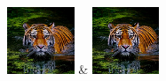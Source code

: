 \begin{table}[h!]
\begin{tabular}
        \includegraphics[width=2cm]{images/processed/tiger/gaussian_5x5_sigma1.0/unblurred_10-iter.png} &
        \includegraphics[width=2cm]{images/processed/tiger/gaussian_5x5_sigma2.0/unblurred_10-iter.png}                                                                                                                                                                                                 \\
    \end{tabular}
\end{table}

